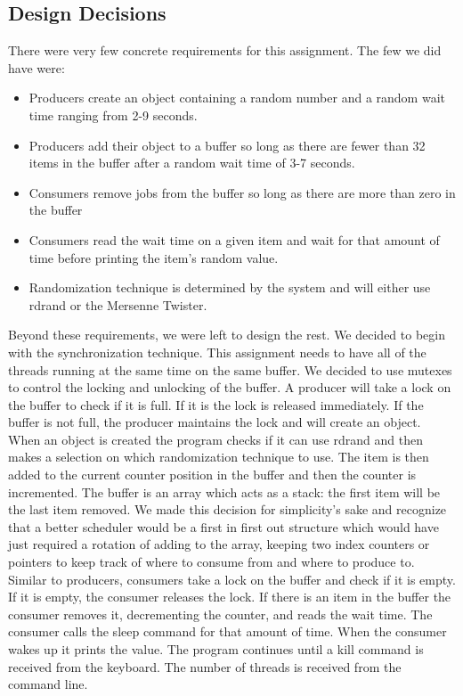 \documentclass[letterpaper,10pt,serif,draftclsnofoot,onecolumn,compsoc,titlepage]{article}%
\begin{document}
\subsection{Design Decisions}
There were very few concrete requirements for this assignment. The few we 
did have were:
\begin{itemize}
\item Producers create an object containing a random number and a random 
wait time ranging from 2-9 seconds.
\item Producers add their object to a buffer so long as there are fewer 
than 32 items in the buffer after a random wait time of 3-7 seconds.
\item Consumers remove jobs from the buffer so long as there are more than 
zero in the buffer
\item Consumers read the wait time on a given item and wait for that amount 
of time before printing the item's random value.
\item Randomization technique is determined by the system and will either 
use rdrand or the Mersenne Twister.
\end{itemize}
Beyond these requirements, we were left to design the rest. We decided to 
begin with the synchronization technique. This assignment needs to have 
all of the threads running at the same time on the same buffer. We decided 
to use mutexes to control the locking and unlocking of the buffer. A 
producer will take a lock on the buffer to check if it is full. If it is 
the lock is released immediately. If the buffer is not full, the producer 
maintains the lock and will create an object. When an object is created 
the program checks if it can use rdrand and then makes a selection on 
which randomization technique to use. The item is then added to the current 
counter position in the buffer and then the counter is incremented. The 
buffer is an array which acts as a stack: the first item will be the last 
item removed. We made this decision for simplicity's sake and recognize 
that a better scheduler would be a first in first out structure which 
would have just required a rotation of adding to the array, keeping two 
index counters or pointers to keep track of where to consume from and 
where to produce to. Similar to producers, consumers take a lock on the 
buffer and check if it is empty. If it is empty, the consumer releases the 
lock. If there is an item in the buffer the consumer removes it, 
decrementing the counter, and reads the wait time. The consumer calls the 
sleep command for that amount of time. When the consumer wakes up it prints 
the value. The program continues until a kill command is received from the 
keyboard. The number of threads is received from the command line. 
\end{document}

